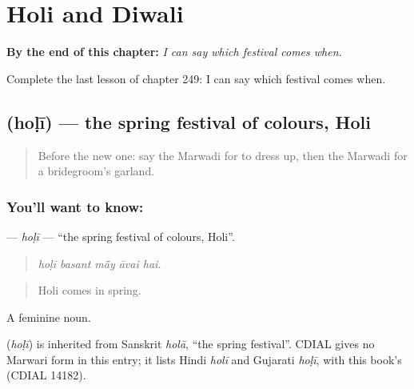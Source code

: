 
\chapter{Holi and Diwali}
\label{ch:mw-holi-and-diwali}

\begin{chapteropening}
\textbf{By the end of this chapter:} \emph{I can say which festival comes when.}

Complete the last lesson of chapter 249: I can say which festival comes when.
\end{chapteropening}

\section[\texorpdfstring{\mw{होळी} (hoḷī)}{होळी (hoḷī)}]{ (hoḷī) — the spring festival of colours, Holi}

\label{lesson:MW-C249-holi}



\begin{quote}
Before the new one: say the Marwadi for to dress up, then the Marwadi for a bridegroom's garland.
\end{quote}

\subsection*{You'll want to know: }
\textbf{} — \emph{hoḷī} — \textquotedblleft{}the spring festival of colours, Holi\textquotedblright{}.

\begin{quote}
    
\end{quote}

\begin{quote}
\emph{hoḷī basant mā̃y āvai hai.}
\end{quote}

\begin{quote}
Holi comes in spring.
\end{quote}

A feminine noun.

\begin{cousinweb}
\textbf{} (\emph{hoḷī}) is inherited from Sanskrit \emph{holā}, \textquotedblleft{}the spring festival\textquotedblright{}. CDIAL gives no Marwari form in this entry; it lists Hindi \emph{holī} and Gujarati \emph{hoḷī}, with this book's  (CDIAL 14182).
\end{cousinweb}

